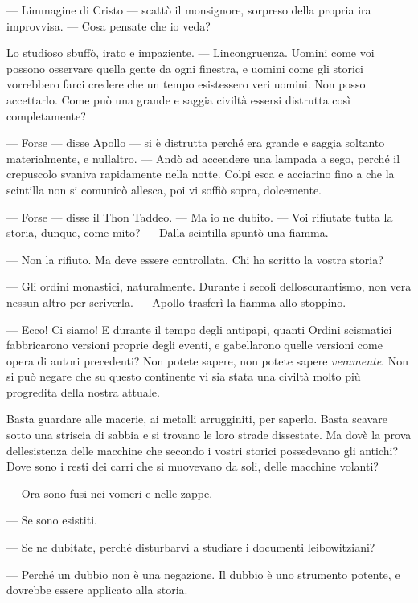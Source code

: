 	--- L\textquotesingle immagine di Cristo --- scattò il monsignore,
	sorpreso della propria ira improvvisa. --- Cosa pensate che io veda?
	
	Lo studioso sbuffò, irato e impaziente. ---
	L\textquotesingle incongruenza. Uomini come voi possono osservare quella
	gente da ogni finestra, e uomini come gli storici vorrebbero farci
	credere che un tempo esistessero veri uomini. Non posso accettarlo. Come
	può una grande e saggia civiltà essersi distrutta così completamente?
	
	--- Forse --- disse Apollo --- si è distrutta perché era grande e saggia
	soltanto materialmente, e null\textquotesingle altro. --- Andò ad
	accendere una lampada a sego, perché il crepuscolo svaniva rapidamente
	nella notte. Colpi esca e acciarino fino a che la scintilla non si
	comunicò all\textquotesingle esca, poi vi soffiò sopra, dolcemente.
	
	--- Forse --- disse il Thon Taddeo. --- Ma io ne dubito. --- Voi
	rifiutate tutta la storia, dunque, come mito? --- Dalla scintilla spuntò
	una fiamma.
	
	--- Non la rifiuto. Ma deve essere controllata. Chi ha scritto la vostra
	storia?
	
	--- Gli ordini monastici, naturalmente. Durante i secoli
	dell\textquotesingle oscurantismo, non v\textquotesingle era nessun
	altro per scriverla. --- Apollo trasferì la fiamma allo stoppino.
	
	--- Ecco! Ci siamo! E durante il tempo degli antipapi, quanti Ordini
	scismatici fabbricarono versioni proprie degli eventi, e gabellarono
	quelle versioni come opera di autori precedenti? Non potete sapere, non
	potete sapere \emph{veramente}. Non si può negare che su questo
	continente vi sia stata una civiltà molto più progredita della nostra
	attuale.
	
	Basta guardare alle macerie, ai metalli arrugginiti, per saperlo. Basta
	scavare sotto una striscia di sabbia e si trovano le loro strade
	dissestate. Ma dov\textquotesingle è la prova
	dell\textquotesingle esistenza delle macchine che secondo i vostri
	storici possedevano gli antichi? Dove sono i resti dei carri che si
	muovevano da soli, delle macchine volanti?
	
	--- Ora sono fusi nei vomeri e nelle zappe.
	
	--- Se sono esistiti.
	
	--- Se ne dubitate, perché disturbarvi a studiare i documenti
	leibowitziani?
	
	--- Perché un dubbio non è una negazione. Il dubbio è uno strumento
	potente, e dovrebbe essere applicato alla storia.
	
